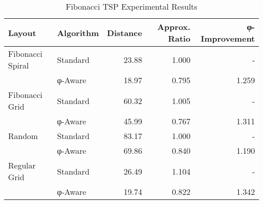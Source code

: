 
\begin{table}[h]
\centering
\caption{Fibonacci TSP Experimental Results}
\begin{tabular}{llrrr}
\hline
Layout & Algorithm & Distance & Approx. Ratio & φ-Improvement \\
\hline
Fibonacci Spiral & Standard & 23.88 & 1.000 & - \\
 & φ-Aware & 18.97 & 0.795 & 1.259 \\
Fibonacci Grid & Standard & 60.32 & 1.005 & - \\
 & φ-Aware & 45.99 & 0.767 & 1.311 \\
Random & Standard & 83.17 & 1.000 & - \\
 & φ-Aware & 69.86 & 0.840 & 1.190 \\
Regular Grid & Standard & 26.49 & 1.104 & - \\
 & φ-Aware & 19.74 & 0.822 & 1.342 \\
\hline
\end{tabular}
\end{table}
